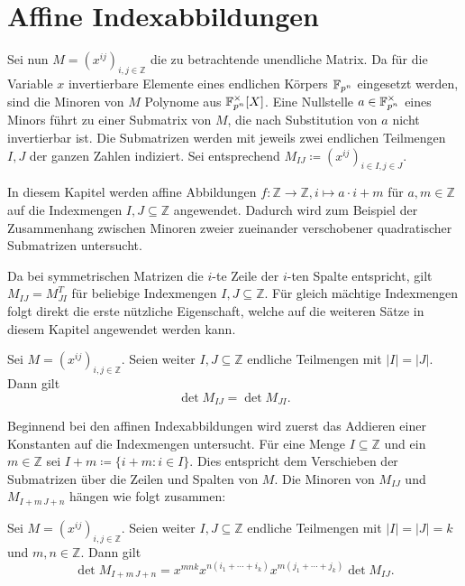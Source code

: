 \section{Affine Indexabbildungen} \label{sec:indextransformationen}

Sei nun $M = \left( x^{ij} \right)_{i,j \in \mathbb{Z}}$ die zu betrachtende unendliche Matrix. Da für die Variable $x$ invertierbare Elemente eines endlichen Körpers $\field{p}[n]$ eingesetzt werden, sind die Minoren von $M$ Polynome aus $\field{p}[n]^\times [X]$. Eine Nullstelle $a \in \field{p}[n]^\times$ eines Minors führt zu einer Submatrix von $M$, die nach Substitution von $a$ nicht invertierbar ist. Die Submatrizen werden mit jeweils zwei endlichen Teilmengen $I,J$ der ganzen Zahlen indiziert. Sei entsprechend $M_{IJ} \coloneqq \left( x^{ij} \right)_{i \in I,j \in J}$.

In diesem Kapitel werden affine Abbildungen $f:\mathbb{Z} \rightarrow \mathbb{Z}, i \mapsto a\cdot i + m$ für $a,m \in \mathbb{Z}$ auf die Indexmengen $I,J \subseteq \mathbb{Z}$ angewendet. Dadurch wird zum Beispiel der Zusammenhang zwischen Minoren zweier zueinander verschobener quadratischer Submatrizen untersucht.

Da bei symmetrischen Matrizen die $i$-te Zeile der $i$-ten Spalte entspricht, gilt $M_{IJ} = M_{JI}^T$ für beliebige Indexmengen $I,J \subseteq \mathbb{Z}$. Für gleich mächtige Indexmengen folgt direkt die erste nützliche Eigenschaft, welche auf die weiteren Sätze in diesem Kapitel angewendet werden kann.

\begin{lemma}
    Sei $M = \left( x^{ij} \right)_{i,j \in \mathbb{Z}}$. Seien weiter $I,J \subseteq \mathbb{Z}$ endliche Teilmengen mit ${|I|=|J|}$. Dann gilt
    \begin{equation*}
        \det{} M_{IJ} = \det M_{JI}.
    \end{equation*}
\end{lemma}

Beginnend bei den affinen Indexabbildungen wird zuerst das Addieren einer Konstanten auf die Indexmengen untersucht. Für eine Menge $I \subseteq \mathbb{Z}$ und ein $m \in \mathbb{Z}$ sei $I+m \coloneqq \{i+m:i\in I\}$. Dies entspricht dem Verschieben der Submatrizen über die Zeilen und Spalten von $M$. Die Minoren von $M_{IJ}$ und $M_{I+m\,J+n}$ hängen wie folgt zusammen:

\begin{satz} \label{satz:translation}
    \sloppy Sei $M = \left( x^{ij} \right)_{i,j \in \mathbb{Z}}$. Seien weiter $I,J \subseteq \mathbb{Z}$ endliche Teilmengen mit ${|I|=|J|=k}$ und $m,n \in \mathbb{Z}$. Dann gilt
    \begin{equation*}
        \det{} M_{I+m\,J+n} = x^{mnk} x^{n(i_1+\cdots +i_k)} x^{m(j_1 +\cdots + j_k)} \det{} M_{IJ}.
    \end{equation*}
\end{satz}

